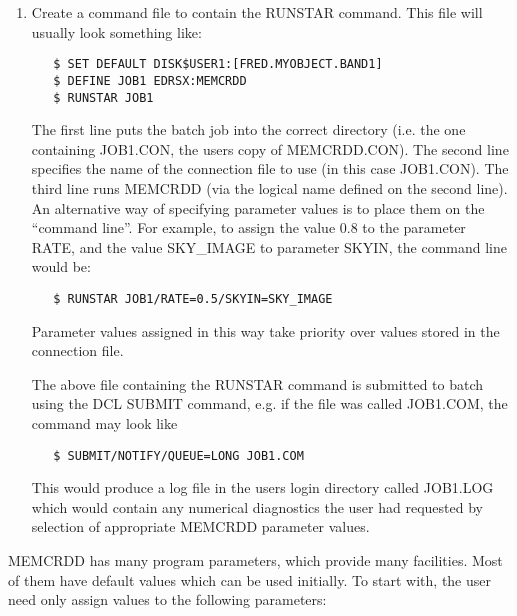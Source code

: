 \begin{enumerate}
\item Create a command file to contain the RUNSTAR command. This file will usually
look something like:

\begin{verbatim}
   $ SET DEFAULT DISK$USER1:[FRED.MYOBJECT.BAND1]
   $ DEFINE JOB1 EDRSX:MEMCRDD
   $ RUNSTAR JOB1
\end{verbatim}

The first line puts the batch job into the correct directory (i.e. the one
containing JOB1.CON, the users copy of MEMCRDD.CON). The second line specifies
the name of the connection file to use (in this case JOB1.CON). The third line
runs MEMCRDD (via the logical name defined on the second line). An  alternative
way of specifying parameter values is to place them on the ``command  line''.
For example, to assign the value 0.8 to the parameter RATE, and the  value
SKY\_IMAGE to parameter SKYIN, the command line would be:

\begin{verbatim}
   $ RUNSTAR JOB1/RATE=0.5/SKYIN=SKY_IMAGE
\end{verbatim}
Parameter values assigned in this way take priority over values stored in the 
connection file.

The above file containing the RUNSTAR command is submitted to batch using the 
DCL SUBMIT command, e.g. if the file was called JOB1.COM, the command may 
look like

\begin{verbatim}
   $ SUBMIT/NOTIFY/QUEUE=LONG JOB1.COM
\end{verbatim}

This would produce a log file in the users login directory called JOB1.LOG
which would contain any numerical diagnostics the user had requested by 
selection of appropriate MEMCRDD parameter values.

\end{enumerate}

MEMCRDD has many program parameters, which provide many facilities. Most of
them  have default values which can be used initially. To start with, the user
need  only assign values to the following parameters:

